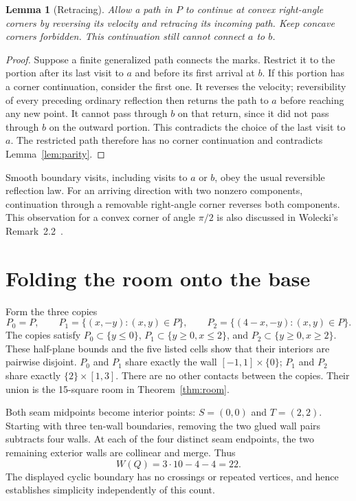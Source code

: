 \documentclass[11pt]{article}
\newtheorem{lemma}[theorem]{Lemma}
\theoremstyle{definition}\newtheorem{definition}[theorem]{Definition}
\begin{document}
\begin{lemma}[Retracing]\label{lem:retrace}
Allow a path in $P$ to continue at convex right-angle corners by reversing its velocity and retracing its incoming path. Keep concave corners forbidden. This continuation still cannot connect $a$ to $b$.
\end{lemma}
\begin{proof}
Suppose a finite generalized path connects the marks. Restrict it to the portion after its last visit to $a$ and before its first arrival at $b$. If this portion has a corner continuation, consider the first one. It reverses the velocity; reversibility of every preceding ordinary reflection then returns the path to $a$ before reaching any new point. It cannot pass through $b$ on that return, since it did not pass through $b$ on the outward portion. This contradicts the choice of the last visit to $a$. The restricted path therefore has no corner continuation and contradicts Lemma~\ref{lem:parity}.
\end{proof}

Smooth boundary visits, including visits to $a$ or $b$, obey the usual reversible reflection law. For an arriving direction with two nonzero components, continuation through a removable right-angle corner reverses both components. This observation for a convex corner of angle $\pi/2$ is also discussed in Wolecki's Remark~2.2~\cite{wolecki}.

\section{Folding the room onto the base}
Form the three copies
\[
 P_0=P,\qquad P_1=\{(x,-y):(x,y)\in P\},\qquad
 P_2=\{(4-x,-y):(x,y)\in P\}.
\]
The copies satisfy $P_0\subset\{y\le0\}$, $P_1\subset\{y\ge0,x\le2\}$, and $P_2\subset\{y\ge0,x\ge2\}$. These half-plane bounds and the five listed cells show that their interiors are pairwise disjoint. $P_0$ and $P_1$ share exactly the wall $[-1,1]\times\{0\}$; $P_1$ and $P_2$ share exactly $\{2\}\times[1,3]$. There are no other contacts between the copies. Their union is the 15-square room in Theorem~\ref{thm:room}.

Both seam midpoints become interior points: $S=(0,0)$ and $T=(2,2)$. Starting with three ten-wall boundaries, removing the two glued wall pairs subtracts four walls. At each of the four distinct seam endpoints, the two remaining exterior walls are collinear and merge. Thus
\[
 W(Q)=3\cdot10-4-4=22.
\]
The displayed cyclic boundary has no crossings or repeated vertices, and hence establishes simplicity independently of this count.
\end{document}
